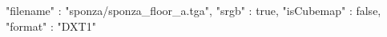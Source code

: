 { 
	"filename" : "sponza/sponza_floor_a.tga", 
	"srgb" : true,
	"isCubemap" : false,
	"format" : "DXT1"
}